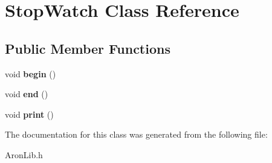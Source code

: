 \hypertarget{class_stop_watch}{}\section{Stop\+Watch Class Reference}
\label{class_stop_watch}
\subsection*{Public Member Functions}
\begin{DoxyCompactItemize}
\item 
\mbox{\label{class_stop_watch_a0fb3ab295580a7d29d55ca52b41f6294}} 
void {\bfseries begin} ()
\item 
\mbox{\label{class_stop_watch_aea19465133bf92b9abfb7da79940c230}} 
void {\bfseries end} ()
\item 
\mbox{\label{class_stop_watch_a11cecbd5155cbd4076816ce24c43a337}} 
void {\bfseries print} ()
\end{DoxyCompactItemize}


The documentation for this class was generated from the following file\+:\begin{DoxyCompactItemize}
\item 
Aron\+Lib.\+h\end{DoxyCompactItemize}
